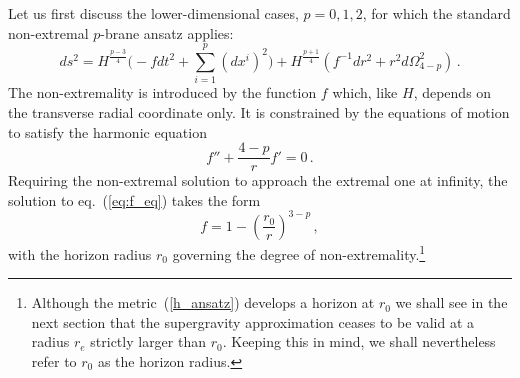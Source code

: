 \documentclass[a4paper,11pt]{article}
\newcommand{\eqref}[1]{(\ref{#1})}
\begin{document}
Let us first discuss the lower-dimensional cases, $p=0,1,2$, for which
the standard non-extremal $p$-brane ansatz applies:
%
\begin{equation}
\label{h_ansatz}
ds^2 = H^{\frac{p-3}{4}} \Big( - f dt^2 + \sum_{i=1}^p (dx^i)^2 \Big)
 + H^{\frac{p+1}{4}} \left( f^{-1}dr^2 + r^2 d\Omega_{4-p}^2 \right)\,.
\end{equation}
%
The non-extremality is introduced by the function $f$ which, like $H$,
depends on the transverse radial coordinate only. It is constrained by
the equations of motion to satisfy the harmonic equation
%
\begin{equation}
\label{eq:f_eq}
f'' + \frac{4-p}{r}f' = 0 \,.
\end{equation}
%
Requiring the non-extremal solution to approach the extremal one at
infinity, the solution to eq.~\eqref{eq:f_eq} takes the form
%
\begin{equation}
\label{f_ansatz}
f = 1 - \left(\frac{r_0}{r}\right)^{3-p} \,,
\end{equation}
with the horizon radius $r_0$ governing the degree of
non-extremality.\footnote{Although the metric~\eqref{h_ansatz}
develops a horizon at $r_0$ we shall see in the next section that the
supergravity approximation ceases to be valid at a radius $r_e$
strictly larger than $r_0$. Keeping this in mind, we shall
nevertheless refer to $r_0$ as the horizon radius.}
\end{document}
